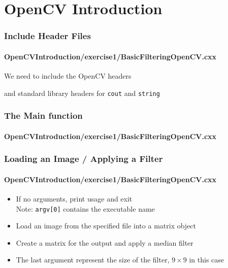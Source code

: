 \section{OpenCV Introduction}






\begin{frame}
\frametitle{Include Header Files}
\framesubtitle{OpenCVIntroduction/exercise1/BasicFilteringOpenCV.cxx}
\begin{center}
We need to include the OpenCV headers

\pause
\vspace{1 em}
and standard library headers for {\tt cout} and {\tt string}

\end{center}
\end{frame}


\begin{frame}
\frametitle{The Main function}
\framesubtitle{OpenCVIntroduction/exercise1/BasicFilteringOpenCV.cxx}
\begin{center}
%
\begin{itemize}

\end{itemize}
\end{center}
\end{frame}


\begin{frame}
\frametitle{Loading an Image / Applying a Filter}
\framesubtitle{OpenCVIntroduction/exercise1/BasicFilteringOpenCV.cxx}
\begin{center}
\begin{itemize}
\item If no arguments, print usage and exit \\
Note: {\tt argv[0]} contains the executable name

\pause
\item Load an image from the specified file into a matrix object

\pause
\item Create a matrix for the output and apply a median filter

\item The last argument represent the size of the filter, $9\times9$ in this case
\end{itemize}
\end{center}
\end{frame}


